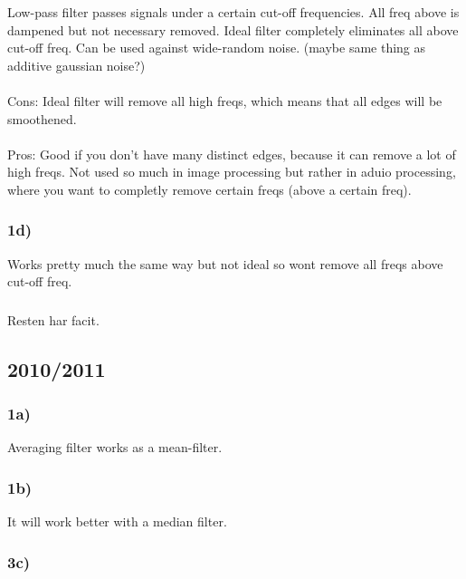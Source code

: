 \documentclass[12pt]{article}
\begin{document}
        Low-pass filter passes signals under a certain cut-off frequencies. All freq above is dampened but not necessary removed. 
        Ideal filter completely eliminates all above cut-off freq. Can be used against wide-random noise. (maybe same thing as additive
        gaussian noise?)\\
        \\
        Cons: Ideal filter will remove all high freqs, which means that all edges will be smoothened.\\
        \\
        Pros: Good if you don't have many distinct edges, because it can remove a lot of high freqs. 
        Not used so much in image processing but rather in aduio processing, where you want to completly 
        remove certain freqs (above a certain freq).
        
    \subsubsection*{1d)}
    
        Works pretty much the same way but not ideal so wont remove all freqs above cut-off freq.
        
    \subsubsection*{}
    
        Resten har facit.
        
\subsection{2010/2011}

    \subsubsection*{1a)}
        
        Averaging filter works as a mean-filter.
        
    \subsubsection*{1b)}
        
        It will work better with a median filter.
        
    \subsubsection*{3c)}
\end{document}
